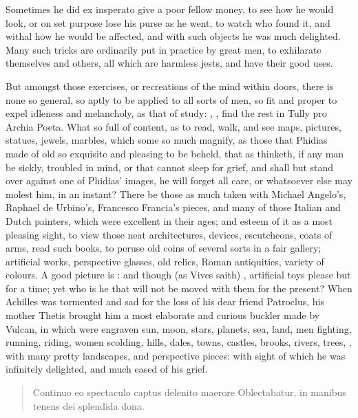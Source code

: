 {Sometimes he did ex insperato give a poor fellow money, to see how he
would look, or on set purpose lose his purse as he went, to watch who
found it, and withal how he would be affected, and with such objects he
was much delighted. Many such tricks are ordinarily put in practice by
great men, to exhilarate themselves and others, all which are harmless
jests, and have their good uses.

But amongst those exercises, or recreations of the mind within doors,
there is none so general, so aptly to be applied to all sorts of men,
so fit and proper to expel idleness and melancholy, as that of study:
, \etc{},
find the rest in Tully pro Archia Poeta. What so full of content,
as to read, walk, and see maps, pictures, statues, jewels, marbles,
which some so much magnify, as those that Phidias made of old so
exquisite and pleasing to be beheld, that as \Chrysostom thinketh,
if any man be sickly, troubled in mind, or that cannot sleep for grief,
and shall but stand over against one of Phidias' images, he will forget
all care, or whatsoever else may molest him, in an instant? There be
those as much taken with Michael Angelo's, Raphael de Urbino's,
Francesco Francia's pieces, and many of those Italian and Dutch
painters, which were excellent in their ages; and esteem of it as a
most pleasing sight, to view those neat architectures, devices,
escutcheons, coats of arms, read such books, to peruse old coins of
several sorts in a fair gallery; artificial works, perspective glasses,
old relics, Roman antiquities, variety of colours. A good picture is
: and though (as Vives saith)
, artificial toys please but
for a time; yet who is he that will not be moved with them for the
present? When Achilles was tormented and sad for the loss of his dear
friend Patroclus, his mother Thetis brought him a most elaborate and
curious buckler made by Vulcan, in which were engraven sun, moon,
stars, planets, sea, land, men fighting, running, riding, women
scolding, hills, dales, towns, castles, brooks, rivers, trees, \etc{},
with many pretty landscapes, and perspective pieces: with sight of
which he was infinitely delighted, and much eased of his grief.
%
\begin{latin}%
\begin{quote}%
Continuo eo spectaculo captus delenito maerore
Oblectabatur, in manibus tenens dei splendida dona.
\end{quote}%
\end{latin}

}
